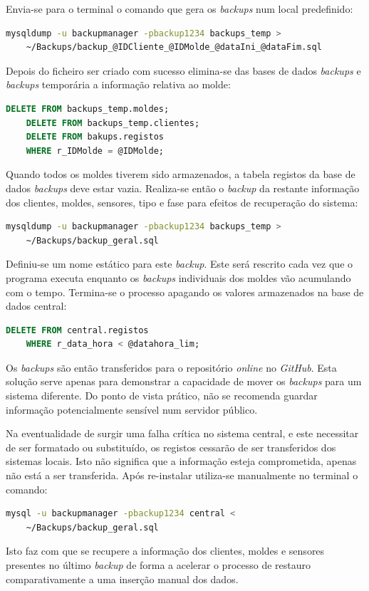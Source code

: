 \documentclass[11pt,twoside,a4paper]{report}
\begin{document}
Envia-se para o terminal o comando que gera os \textit{backups} num local predefinido:
\begin{lstlisting}[language = bash]
	mysqldump -u backupmanager -pbackup1234 backups_temp >
	~/Backups/backup_@IDCliente_@IDMolde_@dataIni_@dataFim.sql
\end{lstlisting}
Depois do ficheiro ser criado com sucesso elimina-se das bases de dados \textit{backups} e \textit{backups} temporária a informação relativa ao molde:
\begin{lstlisting}[language = SQL]
	DELETE FROM backups_temp.moldes;
	DELETE FROM backups_temp.clientes;
	DELETE FROM bakups.registos
	WHERE r_IDMolde = @IDMolde;
\end{lstlisting}
Quando todos os moldes tiverem sido armazenados, a tabela registos da base de dados \textit{backups} deve estar vazia. Realiza-se então o \textit{backup} da restante informação dos clientes, moldes, sensores, tipo e fase para efeitos de recuperação do sistema:
\begin{lstlisting}[language = bash]
	mysqldump -u backupmanager -pbackup1234 backups_temp >
	~/Backups/backup_geral.sql
\end{lstlisting}
Definiu-se um nome estático para este \textit{backup}. Este será rescrito cada vez que o programa executa enquanto os \textit{backups} individuais dos moldes vão acumulando com o tempo. Termina-se o processo apagando os valores armazenados na base de dados central:
\begin{lstlisting}[language = SQL]
	DELETE FROM central.registos
	WHERE r_data_hora < @datahora_lim;
\end{lstlisting}
Os \textit{backups} são então transferidos para o repositório \textit{online} no \textit{GitHub}. Esta solução serve apenas para demonstrar a capacidade de mover os \textit{backups} para um sistema diferente. Do ponto de vista prático, não se recomenda guardar informação potencialmente sensível num servidor público.\par 
Na eventualidade de surgir uma falha crítica no sistema central, e este necessitar de ser formatado ou substituído, os registos cessarão de ser transferidos dos sistemas locais. Isto não significa que a informação esteja comprometida, apenas não está a ser transferida. Após re-instalar utiliza-se manualmente no terminal o comando:
	\begin{lstlisting}[language = bash]
	mysql -u backupmanager -pbackup1234 central <
	~/Backups/backup_geral.sql
\end{lstlisting}
Isto faz com que se recupere a informação dos clientes, moldes e sensores presentes no último \textit{backup} de forma a acelerar o processo de restauro comparativamente a uma inserção manual dos dados.
\end{document}

